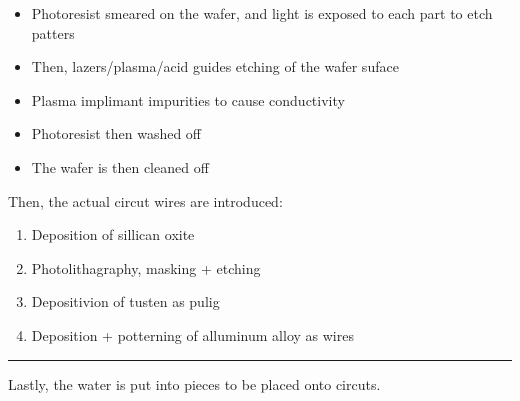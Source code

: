 \documentclass[letterpaper]{article}
\begin{document}
\begin{itemize}
\item Photoresist smeared on the wafer, and light is exposed to each part to
etch patters

\item Then, lazers/plasma/acid guides etching of the wafer suface

\item Plasma implimant impurities to cause conductivity

\item Photoresist then washed off

\item The wafer is then cleaned off
\end{itemize}

Then, the actual circut wires are introduced:

\begin{enumerate}
\item Deposition of sillican oxite
\item Photolithagraphy, masking + etching
\item Depositivion of tusten as pulig
\item Deposition + potterning of alluminum alloy as wires
\end{enumerate}

\noindent\rule{\textwidth}{0.5pt}

Lastly, the water is put into pieces to be placed onto circuts.
\end{document}
